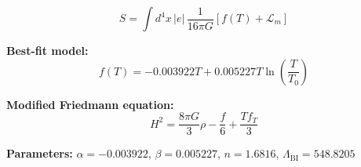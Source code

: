 
\begin{equation}
  S = \int d^4x \, |e| \, \frac{1}{16\pi G} \left[ f(T) + \mathcal{L}_m \right]
\end{equation}

\textbf{Best-fit model:}
\begin{equation}
  f(T) = -0.003922 T + 0.005227 T \ln\!\left(\frac{T}{T_0}\right)
\end{equation}

\textbf{Modified Friedmann equation:}
\begin{equation}
  H^2 = \frac{8\pi G}{3} \rho - \frac{f}{6} + \frac{T f_T}{3}
\end{equation}

\textbf{Parameters:}
$\alpha = -0.003922$, \quad
$\beta = 0.005227$, \quad
$n = 1.6816$, \quad
$\Lambda_{\text{BI}} = 548.8205$